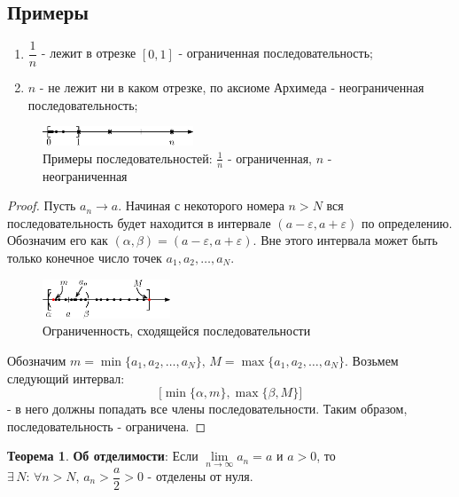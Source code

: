 \documentclass[12pt]{article}
\theoremstyle{definition}
\newtheorem{theorem}{Теорема}
\begin{document}
\subsection*{Примеры}

\begin{enumerate}[label={\arabic*)}]
	\item $\dfrac{1}{n}$ - лежит в отрезке $[0,1]$ - ограниченная последовательность;
	\item $n$ - не лежит ни в каком отрезке, по аксиоме Архимеда - неограниченная последовательность;
\end{enumerate}

\begin{figure}[H]
	\centering
	\includegraphics[width=0.4\textwidth]{8_4.eps}
	\caption{Примеры последовательностей: $\frac{1}{n}$ - ограниченная, $n$ - неограниченная}
	\label{8_3}
\end{figure}


\begin{proof}
	Пусть $a_n \to a$. Начиная с некоторого номера $n > N$ вся последовательность будет находится в интервале $(a-\varepsilon, a +\varepsilon)$ по определению. Обозначим его как $(\alpha, \beta) = (a-\varepsilon, a +\varepsilon)$. Вне этого интервала может быть только конечное число точек $a_1, a_2, \dotsc, a_N$. 
	
	\begin{figure}[H]
		\centering
		\includegraphics[width=0.34\textwidth]{8_5.eps}
		\caption{Ограниченность, сходящейся последовательности}
		\label{fig:8_5}
	\end{figure}
	
	Обозначим $m = \min\{a_1, a_2, \dotsc, a_N\}, \, M = \max\{a_1, a_2, \dotsc, a_N\}$. Возьмем следующий интервал: $$\Big[\min\{\alpha,m\}, \max\{\beta,M\}\Big]$$ - в него должны попадать все члены последовательности. Таким образом, последовательность - ограничена.
\end{proof}
	
	
\begin{theorem}\textbf{Об отделимости}: 
	Если  $\lim\limits_{n \rightarrow \infty}{a_n} = a$ и $a > 0$, то $\exists \, N\colon \, \forall n > N, \, a_n > \dfrac{a}{2} > 0$ - отделены от нуля. 
\end{theorem}
\end{document}
